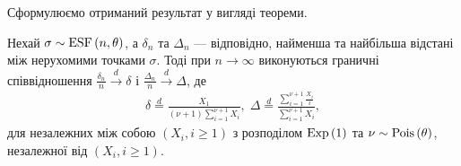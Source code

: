 Сформулюємо отриманий результат у вигляді теореми.
\begin{theorem}
    Нехай $\sigma \sim \mathrm{ESF}\left(n, \theta\right)$, а $\delta_n$ та $\Delta_n$ ---
    відповідно, найменша та найбільша відстані між нерухомими точками $\sigma$.
    Тоді при $n\to\infty$ виконуються граничні
    співвідношення
    $\frac{\delta_n}{n} \overset{d}{\longrightarrow} \delta$ і 
    $\frac{\Delta_n}{n} \overset{d}{\longrightarrow} \Delta$, де
    \begin{gather}
        \delta \overset{d}{=}
        \frac{X_1}{(\nu+1)\sum_{i=1}^{\nu+1} X_i}, \;
        \Delta \overset{d}{=} 
        \frac{\sum_{i=1}^{\nu+1} \frac{X_i}{i}}{\sum_{i=1}^{\nu+1} X_i},
    \end{gather}
    для незалежних між собою $\left(X_i, i \geq 1\right)$
    з розподілом $\mathrm{Exp}\left(1\right)$ та $\nu \sim \mathrm{Pois}\left(\theta\right)$,
    незалежної від $\left(X_i, i \geq 1\right)$.
\end{theorem}